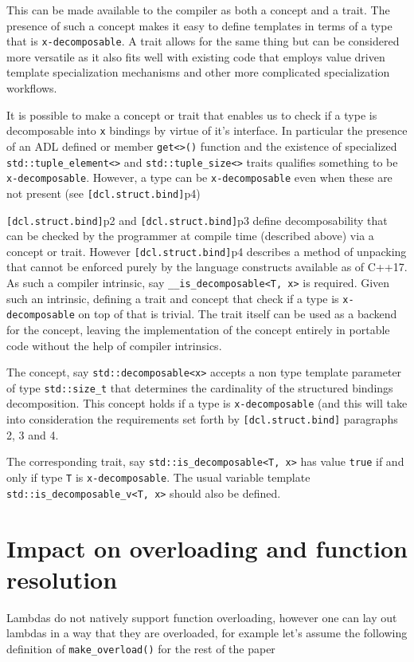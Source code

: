 \documentclass{article}
\begin{document}
This can be made available to the compiler as both a concept and a trait.  The
presence of such a concept makes it easy to define templates in terms of a
type that is \texttt{x-decomposable}.  A trait allows for the same thing but
can be considered more versatile as it also fits well with existing code that
employs value driven template specialization mechanisms and other more
complicated specialization workflows.

It is possible to make a concept or trait that enables us to check if a type
is decomposable into \texttt{x} bindings by virtue of it's interface.  In
particular the presence of an ADL defined or member \texttt{get<>()} function
and the existence of specialized \texttt{std::tuple\_element<>} and
\texttt{std::tuple\_size<>} traits qualifies something to be
\texttt{x-decomposable}.  However, a type can be \texttt{x-decomposable} even
when these are not present (see \texttt{[dcl.struct.bind]}p4)

\texttt{[dcl.struct.bind]}p2 and \texttt{[dcl.struct.bind]}p3 define
decomposability that can be checked by the programmer at compile time
(described above) via a concept or trait.  However
\texttt{[dcl.struct.bind]}p4 describes a method of unpacking that cannot be
enforced purely by the language constructs available as of C++17.  As such a
compiler intrinsic, say \texttt{\_\_is\_decomposable<T, x>} is required.
Given such an intrinsic, defining a trait and concept that check if a type is
\texttt{x-decomposable} on top of that is trivial.  The trait itself can be
used as a backend for the concept, leaving the implementation of the concept
entirely in portable code without the help of compiler intrinsics.

The concept, say \texttt{std::decomposable<x>} accepts a non type template
parameter of type \texttt{std::size\_t} that determines the cardinality of the
structured bindings decomposition.  This concept holds if a type is
\texttt{x-decomposable} (and this will take into consideration the
requirements set forth by \texttt{[dcl.struct.bind]} paragraphs 2, 3 and 4.

The corresponding trait, say \texttt{std::is\_decomposable<T, x>} has value
\texttt{true} if and only if type \texttt{T} is \texttt{x-decomposable}.  The
usual variable template \texttt{std::is\_decomposable\_v<T, x>} should also be
defined.


\section{Impact on overloading and function resolution}
Lambdas do not natively support function overloading, however one can lay out
lambdas in a way that they are overloaded, for example let's assume the
following definition of \texttt{make\_overload()} for the rest of the paper
\end{document}

